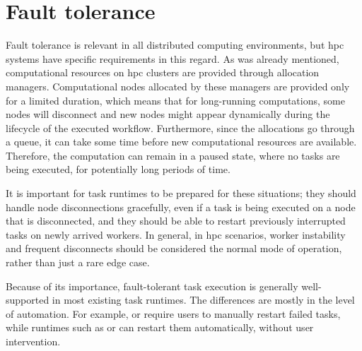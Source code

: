 \section{Fault tolerance}
Fault tolerance is relevant in all distributed computing environments, but \gls{hpc}
systems have specific requirements in this regard. As was already mentioned, computational
resources on \gls{hpc} clusters are provided through allocation managers.
Computational nodes allocated by these managers are provided only for a limited duration, which
means that for long-running computations, some nodes will disconnect and new nodes might appear
dynamically during the lifecycle of the executed workflow. Furthermore, since the allocations go
through a queue, it can take some time before new computational resources are available. Therefore,
the computation can remain in a paused state, where no tasks are being executed, for potentially
long periods of time.

It is important for task runtimes to be prepared for these situations; they should handle node
disconnections gracefully, even if a task is being executed on a node that is disconnected, and
they should be able to restart previously interrupted tasks on newly arrived workers. In general,
in \gls{hpc} scenarios, worker instability and frequent disconnects should be
considered the normal mode of operation, rather than just a rare edge case.

Because of its importance, fault-tolerant task execution is generally well-supported in most
existing task runtimes. The differences are mostly in the level of automation. For example,
\fireworks{} or \merlin{} require users to manually restart failed tasks,
while runtimes such as \dask{} or \balsam{} can restart them
automatically, without user intervention.

